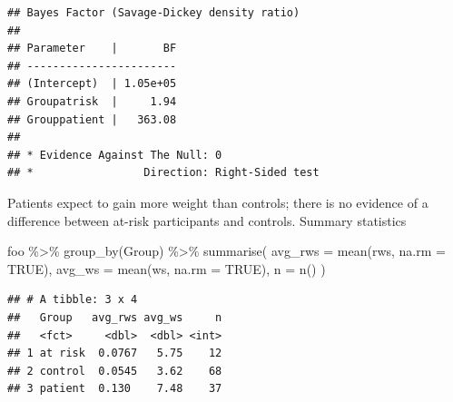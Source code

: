 \documentclass[
]{article}
\newenvironment{Shaded}{\begin{snugshade}}{\end{snugshade}}
\newcommand{\AttributeTok}[1]{\textcolor[rgb]{0.77,0.63,0.00}{#1}}
\newcommand{\ConstantTok}[1]{\textcolor[rgb]{0.00,0.00,0.00}{#1}}
\newcommand{\FunctionTok}[1]{\textcolor[rgb]{0.00,0.00,0.00}{#1}}
\newcommand{\NormalTok}[1]{#1}
\newcommand{\SpecialCharTok}[1]{\textcolor[rgb]{0.00,0.00,0.00}{#1}}
\begin{document}
\begin{verbatim}
## Bayes Factor (Savage-Dickey density ratio)
## 
## Parameter    |       BF
## -----------------------
## (Intercept)  | 1.05e+05
## Groupatrisk  |     1.94
## Grouppatient |   363.08
## 
## * Evidence Against The Null: 0
## *                 Direction: Right-Sided test
\end{verbatim}

Patients expect to gain more weight than controls; there is no evidence
of a difference between at-risk participants and controls. Summary
statistics

\begin{Shaded}
\begin{Highlighting}[]
\NormalTok{foo }\SpecialCharTok{\%\textgreater{}\%} 
  \FunctionTok{group\_by}\NormalTok{(Group) }\SpecialCharTok{\%\textgreater{}\%} 
  \FunctionTok{summarise}\NormalTok{(}
    \AttributeTok{avg\_rws =} \FunctionTok{mean}\NormalTok{(rws, }\AttributeTok{na.rm =} \ConstantTok{TRUE}\NormalTok{),}
    \AttributeTok{avg\_ws =} \FunctionTok{mean}\NormalTok{(ws, }\AttributeTok{na.rm =} \ConstantTok{TRUE}\NormalTok{),}
    \AttributeTok{n =} \FunctionTok{n}\NormalTok{()}
\NormalTok{  )}
\end{Highlighting}
\end{Shaded}

\begin{verbatim}
## # A tibble: 3 x 4
##   Group   avg_rws avg_ws     n
##   <fct>     <dbl>  <dbl> <int>
## 1 at risk  0.0767   5.75    12
## 2 control  0.0545   3.62    68
## 3 patient  0.130    7.48    37
\end{verbatim}
\end{document}

